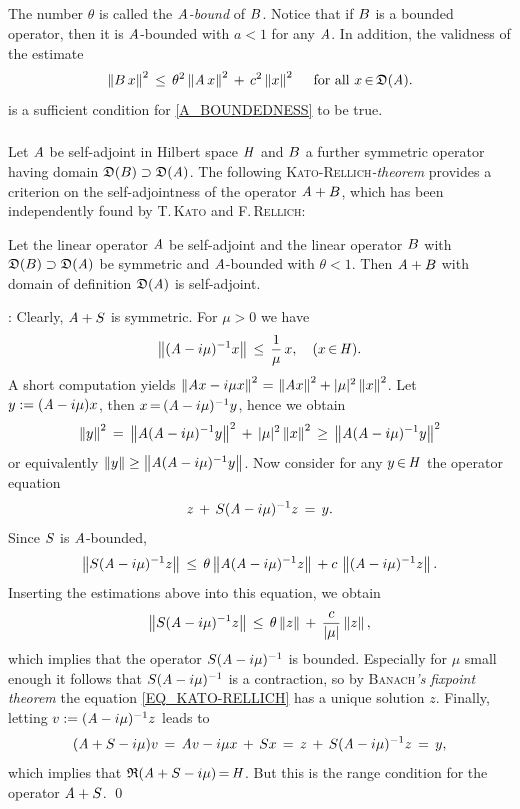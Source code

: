 \documentclass[11pt,twoside]{article}
\begin{document}
\subparagraph*{}
The number $\theta$ is called the $\mathit{A}$\textit{-bound} of ${B}$.
Notice that if ${B}$ is a bounded operator,
then it is $\mathit{A}$-bounded with $a<1$ for any $\mathit{A}$.
In addition,
the validness of the estimate
\[
\left\lVert {B} \,x \right\rVert^2 \, \leq \,
\theta^2 \left\lVert \mathit{A} \,x \right\rVert^2 \, + \, c^2 \left\lVert x \right\rVert^2
\quad \mbox{ for all } x {\,\in\,} \mathfrak{D}(\mathit{A}).
\]
is a sufficient condition for \eqref{A_BOUNDEDNESS} to be true.

\subsubsection*{} %
Let $\mathit{A}$ be self-adjoint in Hilbert space $\mathit{H}$ and ${B}$ 
a further symmetric operator having domain
$\mathfrak{D}({B}) \supset \mathfrak{D}(\mathit{A})$.
The following \textsc{Kato-Rellich}\textit{-theorem}
provides a criterion on the self-adjointness
of the operator $\mathit{A}+{B}$,
which has been independently found by \textsc{T.\,Kato}
and \textsc{F.\,Rellich}:

\begin{theorem}\label{KATO-RELLICH_THEOREM_I}
Let the linear operator $\mathit{A}$ be self-adjoint and 
the linear operator ${B}$ with $\mathfrak{D}({B}) \supset \mathfrak{D}(\mathit{A})$ 
be symmetric and $\mathit{A}$-bounded with $\theta < 1$.
Then $\mathit{A}+{B}$ with domain of definition $\mathfrak{D}(\mathit{A})$ is self-adjoint.
\end{theorem}

\Proof:
Clearly, $\mathit{A} + {S}$ is symmetric.
For $\mu > 0$ we have
\[
\left\lVert (\mathit{A} - i \mu)^{-1} x \right\rVert \, \leq \, \frac{1}{\mu} \, x,
\quad (x {\,\in\,} \mathit{H}).
\]
A short computation yields
$\norm{\linA x - i \mu x}^2 \eq \norm{\linA x}^2 + \abs{\mu} ^2 \norm{x}^2$.
Let $y := (\mathit{A}-i \mu) x$, then $x {\,=\,} (\mathit{A} -i \mu)^{-1} y$,
hence we obtain
\[
\norm{y}^2 \= \norm{\linA (\linA -i \mu)^{-1} y}^2
           \, + \,
                   \abs{\mu} ^2 \norm{x}^2
           \, \geq \,
                   \norm{\linA (\linA -i \mu)^{-1} y}^2
\]
or equivalently $\left\lVert y \right\rVert \geq \left\lVert \mathit{A} (\mathit{A} -i \mu)^{-1} y \right\rVert$.
Now consider for any $y {\,\in\,} \mathit{H}$ the operator equation
\begin{equation}\label{EQ_KATO-RELLICH}
z \, + \, {S}(\mathit{A} - i \mu)^{-1}z \,=\, y.
\end{equation}
Since ${S}$ is $\mathit{A}$-bounded,
\[
\left\lVert {S}(\mathit{A} - i \mu)^{-1}z \right\rVert \, \leq \,
\theta \left\lVert \mathit{A}(\mathit{A} - i \mu)^{-1}z \right\rVert \, + c \, \left\lVert (\mathit{A} - i \mu)^{-1}z \right\rVert.
\]
Inserting the estimations above into this equation, we obtain
\[
\norm{\linS(\linA - i \mu)^{-1}z} \,
\leq \,
\theta \norm{z} \, + \, \frac{c}{\abs{\mu} } \norm{z},
\]
which implies that the operator ${S}(\mathit{A} - i \mu)^{-1}$ is bounded.
Especially for $\mu$ small enough it follows that ${S}(\mathit{A} - i \mu)^{-1}$
is a contraction,
so by \textsc{Banach}\textit{'s fixpoint theorem}
the equation \eqref{EQ_KATO-RELLICH} has a unique solution $z$.
Finally,
letting $v := (\mathit{A} - i \mu)^{-1}z$ leads to
\[
(\mathit{A} + {S} -i \mu)v \,=\,
\mathit{A} v - i\mu x \, + \, {S} x \,=\, z \, + \, {S}(\mathit{A}-i \mu)^{-1} z
\,=\, y,
\]
which implies that $\mathfrak{R}(\mathit{A} + {S} -i\mu) {\,=\,} \mathit{H}$.
But this is the range condition for the operator $\mathit{A} + {S}$.
\qed
\end{document}
